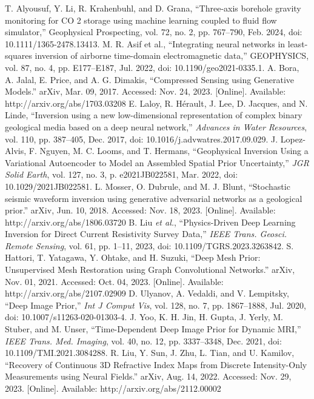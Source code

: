 \documentclass[lettersize,journal]{IEEEtran}
\begin{document}
\begin{thebibliography}{1}
T. Alyousuf, Y. Li, R. Krahenbuhl, and D. Grana, “Three‐axis borehole gravity monitoring for CO 2 storage using machine learning coupled to fluid flow simulator,” Geophysical Prospecting, vol. 72, no. 2, pp. 767–790, Feb. 2024, doi: 10.1111/1365-2478.13413.
M. R. Asif et al., “Integrating neural networks in least-squares inversion of airborne time-domain electromagnetic data,” GEOPHYSICS, vol. 87, no. 4, pp. E177–E187, Jul. 2022, doi: 10.1190/geo2021-0335.1.
A. Bora, A. Jalal, E. Price, and A. G. Dimakis, “Compressed Sensing using Generative Models.” arXiv, Mar. 09, 2017. Accessed: Nov. 24, 2023. [Online]. Available: http://arxiv.org/abs/1703.03208
E. Laloy, R. Hérault, J. Lee, D. Jacques, and N. Linde, “Inversion using a new low-dimensional representation of complex binary geological media based on a deep neural network,” \textit{Advances in Water Resources}, vol. 110, pp. 387–405, Dec. 2017, doi: 10.1016/j.advwatres.2017.09.029.
J. Lopez‐Alvis, F. Nguyen, M. C. Looms, and T. Hermans, “Geophysical Inversion Using a Variational Autoencoder to Model an Assembled Spatial Prior Uncertainty,” \textit{JGR Solid Earth}, vol. 127, no. 3, p. e2021JB022581, Mar. 2022, doi: 10.1029/2021JB022581.
L. Mosser, O. Dubrule, and M. J. Blunt, “Stochastic seismic waveform inversion using generative adversarial networks as a geological prior.” arXiv, Jun. 10, 2018. Accessed: Nov. 18, 2023. [Online]. Available: http://arxiv.org/abs/1806.03720
B. Liu \textit{et al.}, “Physics-Driven Deep Learning Inversion for Direct Current Resistivity Survey Data,” \textit{IEEE Trans. Geosci. Remote Sensing}, vol. 61, pp. 1–11, 2023, doi: 10.1109/TGRS.2023.3263842.
S. Hattori, T. Yatagawa, Y. Ohtake, and H. Suzuki, “Deep Mesh Prior: Unsupervised Mesh Restoration using Graph Convolutional Networks.” arXiv, Nov. 01, 2021. Accessed: Oct. 04, 2023. [Online]. Available: http://arxiv.org/abs/2107.02909
D. Ulyanov, A. Vedaldi, and V. Lempitsky, “Deep Image Prior,” \textit{Int J Comput Vis}, vol. 128, no. 7, pp. 1867–1888, Jul. 2020, doi: 10.1007/s11263-020-01303-4.
J. Yoo, K. H. Jin, H. Gupta, J. Yerly, M. Stuber, and M. Unser, “Time-Dependent Deep Image Prior for Dynamic MRI,” \textit{IEEE Trans. Med. Imaging}, vol. 40, no. 12, pp. 3337–3348, Dec. 2021, doi: 10.1109/TMI.2021.3084288.
R. Liu, Y. Sun, J. Zhu, L. Tian, and U. Kamilov, “Recovery of Continuous 3D Refractive Index Maps from Discrete Intensity-Only Measurements using Neural Fields.” arXiv, Aug. 14, 2022. Accessed: Nov. 29, 2023. [Online]. Available: http://arxiv.org/abs/2112.00002

\end{thebibliography}
\end{document}
